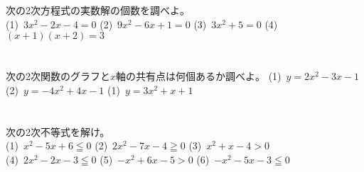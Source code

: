 \begin{multicols*}{4}
  次の2次方程式の実数解の個数を調べよ。
  \vspace{.5zw}\\
  (1)\ $3x^2-2x-4=0$
  (2)\ $9x^2-6x+1=0$
  (3)\ $3x^2+5=0$
  (4)\ $(x+1)(x+2)=3$
  \columnbreak{}\\
  \columnbreak{}\\
  \columnbreak{}\\
  次の2次関数のグラフと$x$軸の共有点は何個あるか調べよ。
  (1)\ $y=2x^2-3x-1$
  (2)\ $y=-4x^2+4x-1$
  (1)\ $y=3x^2+x+1$
  \columnbreak{}\\
  \columnbreak{}\\
  \columnbreak{}\\
  \null\vfill
  次の2次不等式を解け。
  \vspace{.5zw}\\
  (1)\ $x^2-5x+6 \leqq 0$
  (2)\ $2x^2-7x-4 \geqq 0$
  (3)\ $x^2+x-4 > 0$
  \columnbreak{}\\
  \null\vfill
  (4)\ $2x^2-2x-3 \leqq 0$
  (5)\ $-x^2+6x-5 > 0$
  (6)\ $-x^2-5x-3 \leqq 0$

\end{multicols*}
